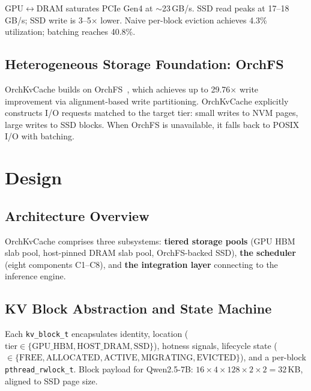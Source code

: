 \documentclass[conference]{IEEEtran}
\begin{document}
GPU$\leftrightarrow$DRAM saturates PCIe Gen4 at ${\sim}$23\,GB/s. SSD read peaks at 17--18\,GB/s; SSD write is 3--5$\times$ lower. Naive per-block eviction achieves 4.3\% utilization; batching reaches 40.8\%.

\subsection{Heterogeneous Storage Foundation: OrchFS}

OrchKvCache builds on OrchFS~\cite{orchfs}, which achieves up to 29.76$\times$ write improvement via alignment-based write partitioning. OrchKvCache explicitly constructs I/O requests matched to the target tier: small writes to NVM pages, large writes to SSD blocks. When OrchFS is unavailable, it falls back to POSIX I/O with batching.


\section{Design}

\subsection{Architecture Overview}


OrchKvCache comprises three subsystems: \textbf{tiered storage pools} (GPU HBM slab pool, host-pinned DRAM slab pool, OrchFS-backed SSD), \textbf{the scheduler} (eight components C1--C8), and \textbf{the integration layer} connecting to the inference engine.

\subsection{KV Block Abstraction and State Machine}

Each \texttt{kv\_block\_t} encapsulates identity, location ($\text{tier} \in \{\text{GPU\_HBM}, \text{HOST\_DRAM}, \text{SSD}\}$), hotness signals, lifecycle state ($\in \{\text{FREE}, \text{ALLOCATED}, \text{ACTIVE}, \text{MIGRATING}, \text{EVICTED}\}$), and a per-block \texttt{pthread\_rwlock\_t}. Block payload for Qwen2.5-7B: $16 \times 4 \times 128 \times 2 \times 2 = 32$\,KB, aligned to SSD page size.
\end{document}
